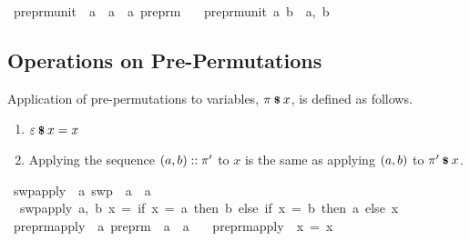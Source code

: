 \begin{implementation}
\isamarkupfalse%
\ preprm{\isacharunderscore}unit\ {\isacharcolon}{\isacharcolon}\ {\isachardoublequoteopen}{\isacharprime}a\ {\isasymRightarrow}\ {\isacharprime}a\ {\isasymRightarrow}\ {\isacharprime}a\ preprm{\isachardoublequoteclose}\ \isanewline
\ \ {\isachardoublequoteopen}preprm{\isacharunderscore}unit\ a\ b\ {\isasymequiv}\ {\isacharbrackleft}{\isacharparenleft}a,\ b{\isacharparenright}{\isacharbrackright}{\isachardoublequoteclose}\isanewline
\end{implementation}

\subsection{Operations on Pre-Permutations}
\begin{definition}
Application of pre-permutations to variables, \(\pi \mathbin{\textrm{\footnotesize{\textbf{\$}}}} x\), is defined as follows.
\begin{enumerate}
\item
\(\varepsilon \mathbin{\textrm{\footnotesize{\textbf{\$}}}} x = x\)
\item
Applying the sequence \(\left(a, b\right) :: \pi'\) to \(x\) is the same as applying \(\left(a, b\right)\) to \(\pi' \mathbin{\textrm{\footnotesize{\textbf{\$}}}} x\).
\end{enumerate}
\end{definition}

\begin{implementation}
\isamarkupfalse%
\ swp{\isacharunderscore}apply\ {\isacharcolon}{\isacharcolon}\ {\isachardoublequoteopen}{\isacharprime}a\ swp\ {\isasymRightarrow}\ {\isacharprime}a\ {\isasymRightarrow}\ {\isacharprime}a{\isachardoublequoteclose}\ \isanewline
\ \ {\isachardoublequoteopen}swp{\isacharunderscore}apply\ {\isacharparenleft}a,\ b{\isacharparenright}\ x\ =\ {\isacharparenleft}if\ x\ =\ a\ then\ b\ else\ {\isacharparenleft}if\ x\ =\ b\ then\ a\ else\ x{\isacharparenright}{\isacharparenright}{\isachardoublequoteclose}\isanewline
\isanewline
{}\isamarkupfalse%
\ preprm{\isacharunderscore}apply\ {\isacharcolon}{\isacharcolon}\ {\isachardoublequoteopen}{\isacharprime}a\ preprm\ {\isasymRightarrow}\ {\isacharprime}a\ {\isasymRightarrow}\ {\isacharprime}a{\isachardoublequoteclose}\ \isanewline
\ \ {\isachardoublequoteopen}preprm{\isacharunderscore}apply\ {\isacharbrackleft}{\isacharbrackright}\ x\ =\ x{\isachardoublequoteclose}\isanewline
\end{implementation}

